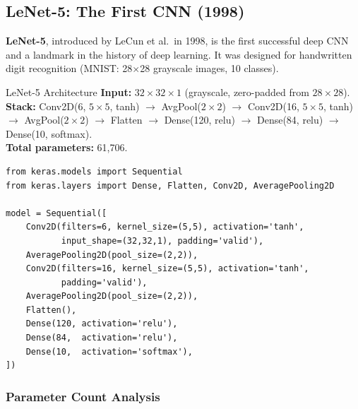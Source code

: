 \documentclass[11pt,a4paper]{article}
\newcommand{\term}[1]{\textcolor{DefGreen}{\textbf{#1}}\index{#1}}
\begin{document}
\subsection{LeNet-5: The First CNN (1998)}
\label{sec:lenet}

\term{LeNet-5}, introduced by LeCun et al.\ in 1998, is the first successful deep CNN and a landmark in the history of deep learning. It was designed for handwritten digit recognition (MNIST: 28$\times$28 grayscale images, 10 classes).

\begin{defbox}{LeNet-5 Architecture}
\textbf{Input:} $32\times32\times1$ (grayscale, zero-padded from $28\times28$).\\
\textbf{Stack:} Conv2D(6, $5\times5$, tanh) $\to$ AvgPool($2\times2$) $\to$ Conv2D(16, $5\times5$, tanh) $\to$ AvgPool($2\times2$) $\to$ Flatten $\to$ Dense(120, relu) $\to$ Dense(84, relu) $\to$ Dense(10, softmax).\\
\textbf{Total parameters:} 61,706.
\end{defbox}

\begin{lstlisting}[caption={LeNet-5 in Keras}]
from keras.models import Sequential
from keras.layers import Dense, Flatten, Conv2D, AveragePooling2D

model = Sequential([
    Conv2D(filters=6, kernel_size=(5,5), activation='tanh',
           input_shape=(32,32,1), padding='valid'),
    AveragePooling2D(pool_size=(2,2)),
    Conv2D(filters=16, kernel_size=(5,5), activation='tanh',
           padding='valid'),
    AveragePooling2D(pool_size=(2,2)),
    Flatten(),
    Dense(120, activation='relu'),
    Dense(84,  activation='relu'),
    Dense(10,  activation='softmax'),
])
\end{lstlisting}



\subsubsection{Parameter Count Analysis}
\end{document}
